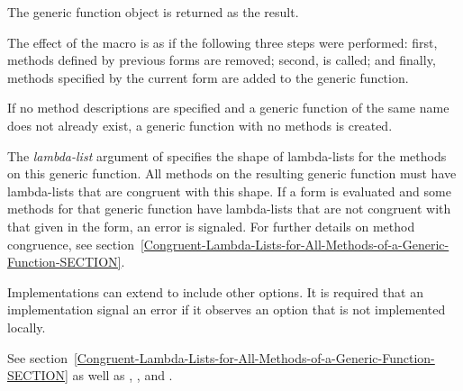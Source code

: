 \begin{defmac}
The generic function object is returned as the result. 


The effect of the  macro is as if the following three
steps were performed: first, methods defined by previous 
 forms are removed; second, 
is called; and finally, methods specified by the current 
 form are added to the generic function. 

If no method descriptions are specified and a generic function of the same
name does not already exist, a generic function with no methods is created.


The \emph{lambda-list\/} argument of 
 specifies the shape of lambda-lists for the methods on
this generic function.  All methods on the resulting generic function must have
lambda-lists that are congruent with this shape.  If a 
 form is evaluated and some methods for that generic
function have lambda-lists that are not congruent with that given in
the  form, an error is signaled.  For further details
on method congruence,
see section~\ref{Congruent-Lambda-Lists-for-All-Methods-of-a-Generic-Function-SECTION}.

Implementations can extend  to include other options.
It is required that an implementation signal an error if
it observes an option that is not implemented locally.

See section~\ref{Congruent-Lambda-Lists-for-All-Methods-of-a-Generic-Function-SECTION}
as well as , , and .
\end{defmac}


